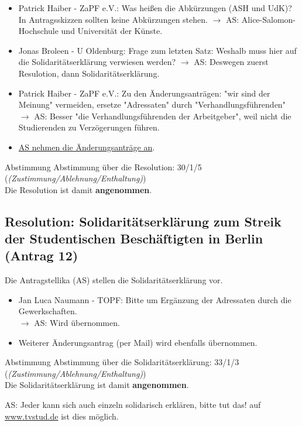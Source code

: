     \begin{itemize}
      \item Patrick Haiber - ZaPF e.V.:  Was heißen die Abkürzungen (ASH und UdK)? In Antragsskizzen sollten keine Abkürzungen stehen.
        $\rightarrow$ AS: Alice-Salomon-Hochschule und Universität der Künste.
      \item Jonas Broleen - U Oldenburg:  Frage zum letzten Satz: Weshalb muss hier auf die Solidaritätserklärung verwiesen werden?
        $\rightarrow$ AS: Deswegen zuerst Resulotion, dann Solidaritätserklärung.
      \item Patrick Haiber - ZaPF e.V.:  Zu den Änderungsanträgen: "wir sind der Meinung" vermeiden, ersetze "Adressaten" durch "Verhandlungsführenden"
        $\rightarrow$ AS: Besser "die Verhandlungsführenden der Arbeitgeber", weil nicht die Studierenden zu Verzögerungen führen.
      \item \underline{AS nehmen die Änderungsanträge an}.
    \end{itemize}

    \begin{success}{Abstimmung}
      Abstimmung über die Resolution: 30/1/5 (\textit{(Zustimmung/Ablehnung/Enthaltung)}) \\
      Die Resolution ist damit \textbf{angenommen}.
    \end{success}

  \subsection{Resolution: Solidaritätserklärung zum Streik der Studentischen Beschäftigten in Berlin (Antrag 12)}
    Die Antragstellika (AS) stellen die Solidaritätserklärung vor. \\

    \begin{itemize}
      \item Jan Luca Naumann - TOPF:  Bitte um Ergänzung der Adressaten durch die Gewerkschaften. \\
        $\rightarrow$ AS: Wird übernommen.
      \item Weiterer Änderungsantrag (per Mail) wird ebenfalls übernommen.
    \end{itemize}

    \begin{success}{Abstimmung}
      Abstimmung über die Solidaritätserklärung: 33/1/3 (\textit{(Zustimmung/Ablehnung/Enthaltung)}) \\
      Die Solidaritätserklärung ist damit \textbf{angenommen}.
    \end{success}
    AS: Jeder kann sich auch einzeln solidarisch erklären, bitte tut das!
    auf \url{www.tvstud.de} ist dies möglich.

